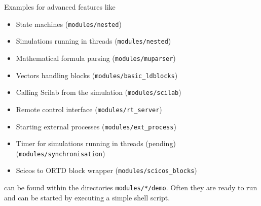 \documentclass[serif,9pt,xcolor=dvipsnames]{beamer}
\begin{document}
\begin{frame}
Examples for advanced features like 

  \begin{itemize}
\item State machines (\texttt{modules/nested})
\item Simulations running in threads (\texttt{modules/nested})
\item Mathematical formula parsing (\texttt{modules/muparser})
\item Vectors handling blocks (\texttt{modules/basic\_ldblocks})
\item Calling Scilab from the simulation (\texttt{modules/scilab})
\item Remote control interface (\texttt{modules/rt\_server})
\item Starting external processes (\texttt{modules/ext\_process})
\item Timer for simulations running in threads (pending) (\texttt{modules/synchronisation})
\item Scicos to ORTD block wrapper (\texttt{modules/scicos\_blocks})
  \end{itemize}

  can be found within the directories \texttt{modules/*/demo}. Often they are ready to run and can be started by executing a simple shell script.
\end{frame}
\end{document}

